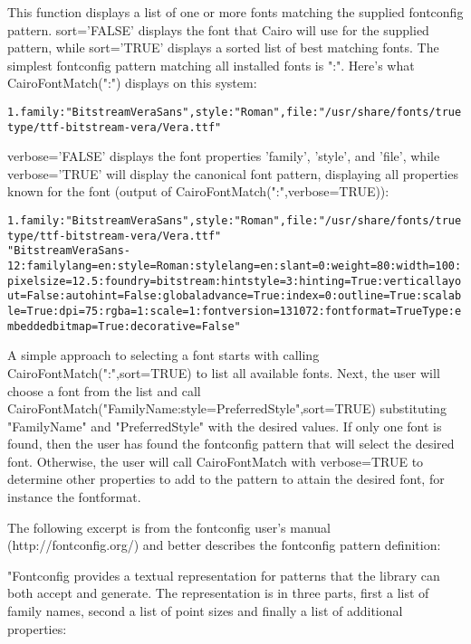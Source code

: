 \begin{Details}\relax
This function displays a list of one or more fonts matching the supplied
fontconfig pattern. sort='FALSE' displays the font that Cairo will use
for the supplied pattern, while sort='TRUE' displays a sorted list of
best matching fonts. The simplest fontconfig pattern matching all installed fonts
is ":". Here's what CairoFontMatch(":") displays on this system:

\begin{alltt}
1. family: "Bitstream Vera Sans", style: "Roman", file: "/usr/share/fonts/truetype/ttf-bitstream-vera/Vera.ttf"
\end{alltt}

verbose='FALSE' displays the font properties 'family', 'style', and 'file', while
verbose='TRUE' will display the canonical font pattern, displaying all properties known
for the font (output of CairoFontMatch(":",verbose=TRUE)):

\begin{alltt}
1. family: "Bitstream Vera Sans", style: "Roman", file: "/usr/share/fonts/truetype/ttf-bitstream-vera/Vera.ttf"
   "Bitstream Vera Sans-12:familylang=en:style=Roman:stylelang=en:slant=0:weight=80:width=100:pixelsize=12.5:foundry=bitstream:hintstyle=3:hinting=True:verticallayout=False:autohint=False:globaladvance=True:index=0:outline=True:scalable=True:dpi=75:rgba=1:scale=1:fontversion=131072:fontformat=TrueType:embeddedbitmap=True:decorative=False"
\end{alltt}

A simple approach to selecting a font starts with calling CairoFontMatch(":",sort=TRUE) to
list all available fonts. Next, the user will choose a font from the list and call
CairoFontMatch("FamilyName:style=PreferredStyle",sort=TRUE) substituting "FamilyName"
and "PreferredStyle" with the desired values. If only one font is found, then the user
has found the fontconfig pattern that will select the desired font. Otherwise, the user
will call CairoFontMatch with verbose=TRUE to determine other properties to add to
the pattern to attain the desired font, for instance the fontformat.

The following excerpt is from the fontconfig user's manual (http://fontconfig.org/) and
better describes the fontconfig pattern definition:

"Fontconfig provides a textual representation for patterns that
the library can both accept and generate. The representation is
in three parts, first a list of family names, second a list of
point sizes and finally a list of additional properties:


\end{Details}
